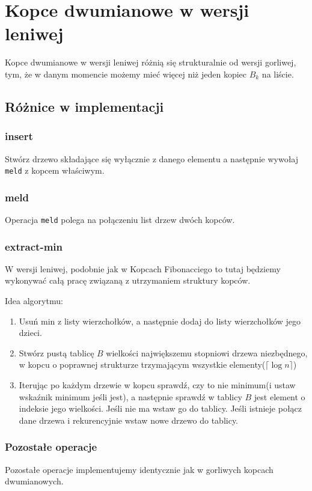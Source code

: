 \section{Kopce dwumianowe w wersji leniwej}

\label{sec:leniwedwumianowe}

Kopce dwumianowe w wersji leniwej różnią się strukturalnie od wersji gorliwej, tym, że w danym momencie możemy mieć więcej niż jeden kopiec $B_k$ na liście.
\subsection{Różnice w implementacji}

\subsubsection{insert}
Stwórz drzewo składające się wyłącznie z danego elementu a następnie wywołaj \texttt{meld} z kopcem właściwym.
\subsubsection{meld}
Operacja \texttt{meld} polega na połączeniu list drzew dwóch kopców.
\subsubsection{extract-min}
W wersji leniwej, podobnie jak w Kopcach Fibonacciego
to tutaj będziemy wykonywać całą pracę związaną z utrzymaniem struktury kopców.

Idea algorytmu:
\begin{enumerate}
 \item Usuń min z listy wierzchołków, a następnie dodaj do listy wierzchołków jego dzieci.
 \item Stwórz pustą tablicę $B$ wielkości największemu stopniowi drzewa niezbędnego, w kopcu o poprawnej strukturze trzymającym wszystkie elementy($\lceil \log n \rceil$)
 \item Iterując po każdym drzewie w kopcu sprawdź, czy to nie minimum(i ustaw wskaźnik minimum jeśli jest),
      a następnie sprawdź w tablicy $B$ jest element o indeksie jego wielkości.
      Jeśli nie ma wstaw go do tablicy. Jeśli istnieje połącz dane drzewa i rekurencyjnie wstaw nowe drzewo do tablicy.
\end{enumerate}

\subsubsection{Pozostałe operacje}
Pozostałe operacje implementujemy identycznie jak w gorliwych kopcach dwumianowych.

